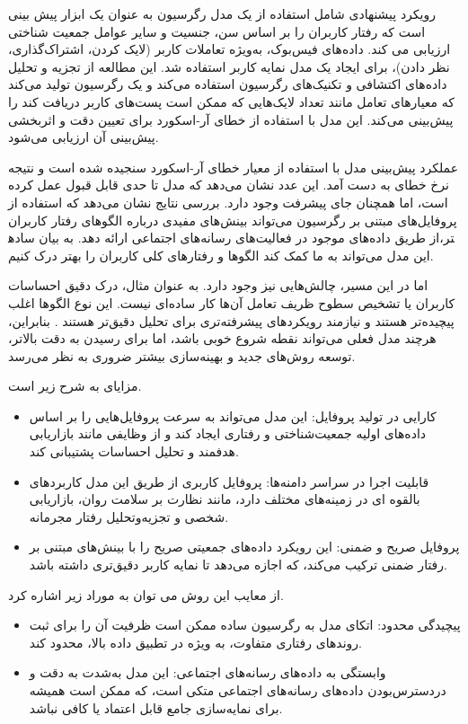 رویکرد پیشنهادی شامل استفاده از یک مدل رگرسیون به عنوان یک ابزار پیش بینی است که رفتار کاربران را بر اساس سن، جنسیت و سایر عوامل جمعیت شناختی ارزیابی می کند. داده‌های فیس‌بوک، به‌ویژه تعاملات کاربر (لایک کردن، اشتراک‌گذاری، نظر دادن)، برای ایجاد یک مدل نمایه کاربر استفاده شد. این مطالعه از تجزیه و تحلیل داده‌های اکتشافی و تکنیک‌های رگرسیون استفاده می‌کند و یک رگرسیون تولید می‌کند که معیارهای تعامل مانند تعداد لایک‌هایی که ممکن است پست‌های کاربر دریافت کند را پیش‌بینی می‌کند. این مدل با استفاده از خطای 
آر-اسکورد%
برای تعیین دقت و اثربخشی پیش‌بینی آن ارزیابی می‌شود.
\newcommand{\RLnum}[1]{#1} %
\newcommand{\num}[1]{%
   \LR{\hspace{0pt}#1\hspace{0pt}}
}

عملکرد پیش‌بینی مدل با استفاده از معیار خطای آر-اسکورد سنجیده شده است و نتیجه نرخ خطای \num{۰.۱۹۹} به دست آمد. 
این عدد نشان می‌دهد که مدل تا حدی قابل قبول عمل کرده است، اما همچنان جای پیشرفت وجود دارد. بررسی نتایج نشان می‌دهد که استفاده از پروفایل‌های مبتنی بر رگرسیون می‌تواند بینش‌های مفیدی درباره الگوهای رفتار کاربران از طریق داده‌های موجود در فعالیت‌های رسانه‌های اجتماعی ارائه دهد. به بیان ساده‎تر، این مدل می‌تواند به ما کمک کند الگوها و رفتارهای کلی کاربران را بهتر درک کنیم.

اما در این مسیر، چالش‌هایی نیز وجود دارد. به عنوان مثال، درک دقیق احساسات کاربران یا تشخیص سطوح ظریف تعامل آن‌ها کار ساده‌ای نیست. این نوع الگوها اغلب پیچیده‌تر هستند و نیازمند رویکردهای پیشرفته‌تری برای تحلیل دقیق‌تر هستند%
\cite{azzam2022model}
. بنابراین، هرچند مدل فعلی می‌تواند نقطه شروع خوبی باشد، اما برای رسیدن به دقت بالاتر، توسعه روش‌های جدید و بهینه‌سازی بیشتر ضروری به نظر می‌رسد.


مزایای %
\cite{azzam2022model}
 به شرح زیر است.
\begin{itemize}
\item
کارایی در تولید پروفایل: این مدل می‌تواند به سرعت پروفایل‌هایی را بر اساس داده‌های اولیه جمعیت‌شناختی و رفتاری ایجاد کند و از وظایفی مانند بازاریابی هدفمند و تحلیل احساسات پشتیبانی کند.
\item
قابلیت اجرا در سراسر دامنه‌ها: پروفایل کاربری از طریق این مدل کاربردهای بالقوه ای در زمینه‌های مختلف دارد، مانند نظارت بر سلامت روان، بازاریابی شخصی و تجزیه‌وتحلیل رفتار مجرمانه.
\item
پروفایل صریح و ضمنی: این رویکرد داده‌های جمعیتی صریح را با بینش‌های مبتنی بر رفتار ضمنی ترکیب می‌کند، که اجازه می‌دهد تا نمایه کاربر دقیق‌تری داشته باشد.
\end{itemize}
از معایب این روش می توان به موراد زیر اشاره کرد.
\begin{itemize}
\item
پیچیدگی محدود: اتکای مدل به رگرسیون ساده ممکن است ظرفیت آن را برای ثبت روندهای رفتاری متفاوت، به ویژه در تطبیق داده بالا، محدود کند.
\item
وابستگی به داده‌های رسانه‌های اجتماعی: این مدل به‌شدت به دقت و دردسترس‌بودن داده‌های رسانه‌های اجتماعی متکی است، که ممکن است همیشه برای نمایه‌سازی جامع قابل اعتماد یا کافی نباشد.
\end{itemize}


